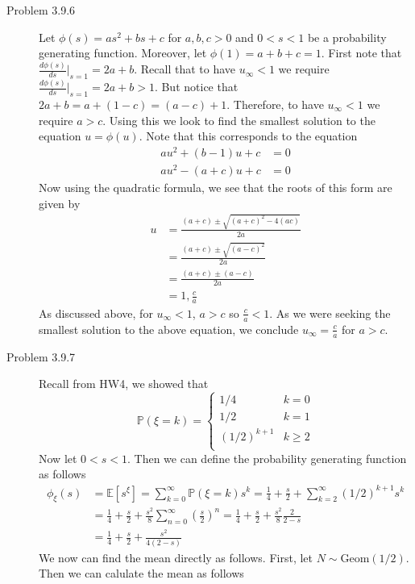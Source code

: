 \documentclass[12pt]{article}  %
\newcommand{\E}{{\mathbb{E}}}
\newcommand{\prob}{{\mathbb{P}}}
\begin{document}
\begin{description}
\item[Problem 3.9.6] Let $\phi(s) = as^2 + bs + c$ for $a,b,c>0$ and $0<s<1$ be a probability generating function. Moreover, let $\phi(1) = a+b+c = 1$. First note that $\frac{d\phi(s)}{ds}\Big\vert_{s = 1} = 2a + b$. Recall that to have $u_{\infty}<1$ we require $\frac{d\phi(s)}{ds}\Big\vert_{s = 1} = 2a + b>1$. But notice that $2a+b = a + (1-c) = (a - c) + 1$. Therefore, to have $u_{\infty}<1$ we require $a>c$. Using this we look to find the smallest solution to the equation $u = \phi(u)$. Note that this corresponds to the equation 
\begin{align*}
au^2 + (b-1)u + c &= 0\\
au^2 - (a+c)u + c &= 0
\end{align*}
Now using the quadratic formula, we see that the roots of this form are given by 
\begin{align*}
u &= \frac{(a+c)\pm \sqrt{(a+c)^2 - 4(ac)}}{2a}\\
&= \frac{(a+c)\pm \sqrt{(a-c)^2}}{2a}\\
&= \frac{(a+c)\pm (a-c)}{2a}\\
&= 1, \frac{c}{a}
\end{align*}
As discussed above, for $u_{\infty}<1$, $a>c$ so $\frac{c}{a}<1$. As we were seeking the smallest solution to the above equation, we conclude $u_{\infty} = \frac{c}{a}$ for $a>c$. 
\item[Problem 3.9.7] 
Recall from HW4, we showed that 
\[\prob(\xi = k) = 
\begin{cases}
1/4 & k = 0\\
1/2 & k = 1\\
(1/2)^{k+1} & k \geq 2\\
\end{cases}
\]
Now let $0<s<1$. Then we can define the probability generating function as follows
\begin{align*}
\phi_{\xi}(s) &= \E[s^{\xi}] = \sum_{k = 0}^{\infty}\prob(\xi = k)s^{k} = \frac{1}{4} + \frac{s}{2} +\sum_{k = 2}^{\infty}(1/2)^{k+1}s^k\\
&= \frac{1}{4} + \frac{s}{2} + \frac{s^2}{8}\sum_{n=0}^{\infty}\left(\frac{s}{2}\right)^n = \frac{1}{4} + \frac{s}{2} + \frac{s^2}{8}\frac{2}{2 - s}\\
&= \frac{1}{4} + \frac{s}{2} + \frac{s^2}{4(2-s)}
\end{align*}
We now can find the mean directly as follows. First, let $N \sim \text{Geom}(1/2)$. Then we can calulate the mean as follows 

\end{description}
\end{document}
